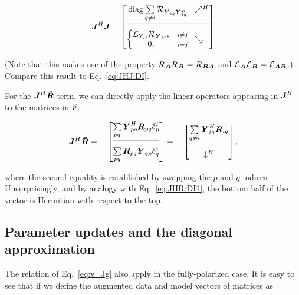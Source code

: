 \documentclass[useAMS,usenatbib]{mn2e}
\newcommand{\mat}[1]{{\bmath{#1}}}
\newcommand{\JJ}{\mat{J}} %
\newcommand{\RR}{\mat{R}}
\newcommand{\JHJ}{\JJ^H\JJ} %
\begin{document}
\begin{equation}
\label{eq:JHJ:pol}
\JHJ = \JHJblocks{
  \mathrm{diag}\sum\limits_{q\ne i} \Rop{\YY_{iq} \YY^H_{iq}} 
}{
  \left \{ 
  \begin{array}{@{}cc@{}}
   \Lop{ Y_{ji}  } \Rop{\YY_{ij}},&{\scriptstyle i\ne j} \\
   0, &{\scriptstyle i=j}
  \end{array} \right . 
}
\end{equation}

(Note that this makes use of the property $\Rop{\mat{A}}\Rop{\mat{B}}=\Rop{\mat{BA}}$ and 
$\Lop{\mat{A}}\Lop{\mat{B}}=\Lop{\mat{AB}}$.) Compare this result to Eq.~\ref{eq:JHJ:DI}.

For the $\JJ^H\RRr$ term, we can directly apply the linear operators appearing in $\JJ^H$ 
to the matrices in $\Rr$:

\begin{equation}
\JJ^H\RRr = -\Matrix{c}{ 
\sum\limits_{pq} \YY^H_{pq} \RR_{pq} \delta^{i}_p  \\
\hline\\[-8pt]
\sum\limits_{pq} \RR_{pq} \YY_{qp} \delta^{i}_q 
} = -\Matrix{c}{
\sum\limits_{q\ne i} \YY^H_{iq} \RR_{iq} \\
\hline\\[-8pt]
\downarrow^H
},
\end{equation}

where the second equality is established by swapping the $p$ and $q$ indices. Unsurprisingly, and by analogy with 
Eq.~\ref{eq:JHR:DI1}, the bottom half of the vector is Hermitian with respect to the top.

\subsection{Parameter updates and the diagonal approximation}

The relation of Eq.~\ref{eq:v_Jg} also apply in the fully-polarized case. It is easy to see that if we define the augmented 
data and model vectors of matrices as
\end{document}
